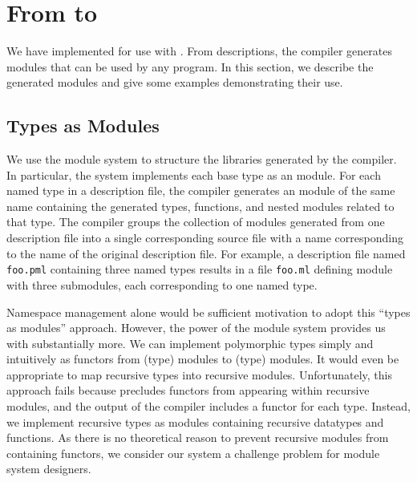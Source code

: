 \section{From \padsmlbig{} to \ocamlbig{}}
\label{sec:padsml-impl}
We have implemented \padsml{} for use with \ocaml{}. From
descriptions, the \padsml{} compiler generates \ocaml{} modules that
can be used by any \ocaml{} program. In this section, we describe the
generated modules and give some examples demonstrating their use.


\subsection{Types as Modules}
\label{sec:gen-code}
We use the \ocaml{} module system to structure the libraries generated
by the \padsml{} compiler.
In particular, the \padsml{} system implements each base type as an
\ocaml{} module.  
For each named type in a description file, the \padsml{} compiler
generates an \ocaml{} module of the same name containing the
generated types, functions, and nested modules related to that type. 
The compiler groups the collection of modules generated from one
description file  into a single corresponding \ocaml{} source file with a
name corresponding to the name of the original description file. For
example, a description file named \texttt{foo.pml} containing
three named types results in a file \texttt{foo.ml} defining
module  with three submodules, each corresponding to
one named type. 

Namespace management alone would be sufficient  
motivation to adopt this ``types as modules'' approach. However, the
power of the \ml{} module system provides us with substantially more.
We can implement polymorphic \padsml{} types simply
and intuitively as functors from (type) modules to (type) modules. It
would even be appropriate to map recursive \padsml{} types into recursive
modules. Unfortunately, this approach fails because \ocaml{}
precludes functors from appearing within recursive modules,
and the output of the \padsml{} compiler includes a functor for each
type.  Instead, we implement recursive types as modules
containing recursive datatypes and functions.
As there is no theoretical reason to prevent recursive modules from
containing functors\cite{???}, we consider our system a
challenge problem for module system designers.

